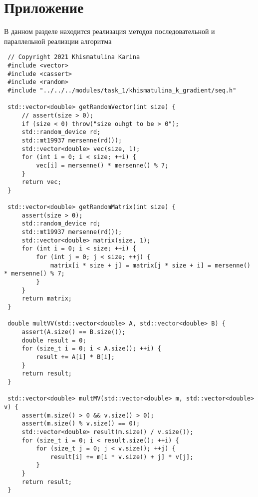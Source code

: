 \documentclass{report}
\begin{document}
 \section*{Приложение}
 В данном разделе находится реализация методов последовательной и параллельной реализции алгоритма
 \begin{lstlisting}
 // Copyright 2021 Khismatulina Karina
 #include <vector>
 #include <cassert>
 #include <random>
 #include "../../../modules/task_1/khismatulina_k_gradient/seq.h"

 std::vector<double> getRandomVector(int size) {
     // assert(size > 0);
     if (size < 0) throw("size ouhgt to be > 0");
     std::random_device rd;
     std::mt19937 mersenne(rd());
     std::vector<double> vec(size, 1);
     for (int i = 0; i < size; ++i) {
         vec[i] = mersenne() * mersenne() % 7;
     }
     return vec;
 }

 std::vector<double> getRandomMatrix(int size) {
     assert(size > 0);
     std::random_device rd;
     std::mt19937 mersenne(rd());
     std::vector<double> matrix(size, 1);
     for (int i = 0; i < size; ++i) {
         for (int j = 0; j < size; ++j) {
             matrix[i * size + j] = matrix[j * size + i] = mersenne() * mersenne() % 7;
         }
     }
     return matrix;
 }

 double multVV(std::vector<double> A, std::vector<double> B) {
     assert(A.size() == B.size());
     double result = 0;
     for (size_t i = 0; i < A.size(); ++i) {
         result += A[i] * B[i];
     }
     return result;
 }

 std::vector<double> multMV(std::vector<double> m, std::vector<double> v) {
     assert(m.size() > 0 && v.size() > 0);
     assert(m.size() % v.size() == 0);
     std::vector<double> result(m.size() / v.size());
     for (size_t i = 0; i < result.size(); ++i) {
         for (size_t j = 0; j < v.size(); ++j) {
             result[i] += m[i * v.size() + j] * v[j];
         }
     }
     return result;
 }


\end{lstlisting}
\end{document}
